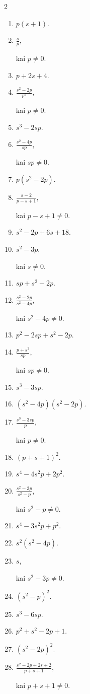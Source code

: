 \documentclass[11pt,a4paper]{article}
\begin{document}
\begin{multicols}{2}
\begin{enumerate}[start=1]
\item \(\displaystyle p(s+1)\).
\item \(\displaystyle \frac sp\),\par\nopagebreak\smallskip kai \(p\ne0\).
\item \(\displaystyle p+2s+4\).
\item \(\displaystyle \frac{s^2-2p}{p^2}\),\par\nopagebreak\smallskip kai \(p\ne0\).
\item \(\displaystyle s^3-2sp\).
\item \(\displaystyle \frac{s^2-4p}{sp}\),\par\nopagebreak\smallskip kai \(sp\ne0\).
\item \(\displaystyle p(s^2-2p)\).
\item \(\displaystyle \frac{s-2}{p-s+1}\),\par\nopagebreak\smallskip kai \(p-s+1\ne0\).
\item \(\displaystyle s^2-2p+6s+18\).
\item \(\displaystyle s^2-3p\),\par\nopagebreak\smallskip kai \(s\ne0\).
\item \(\displaystyle sp+s^2-2p\).
\item \(\displaystyle \frac{s^2-2p}{s^2-4p}\),\par\nopagebreak\smallskip kai \(s^2-4p\ne0\).
\item \(\displaystyle p^2-2sp+s^2-2p\).
\item \(\displaystyle \frac{p+s^2}{sp}\),\par\nopagebreak\smallskip kai \(sp\ne0\).
\item \(\displaystyle s^3-3sp\).
\item \(\displaystyle (s^2-4p)(s^2-2p)\).
\item \(\displaystyle \frac{s^3-3sp}{p}\),\par\nopagebreak\smallskip kai \(p\ne0\).
\item \(\displaystyle (p+s+1)^2\).
\item \(\displaystyle s^4-4s^2p+2p^2\).
\item \(\displaystyle \frac{s^2-3p}{s^2-p}\),\par\nopagebreak\smallskip kai \(s^2-p\ne0\).
\item \(\displaystyle s^4-3s^2p+p^2\).
\item \(\displaystyle s^2(s^2-4p)\).
\item \(\displaystyle s\),\par\nopagebreak\smallskip kai \(s^2-3p\ne0\).
\item \(\displaystyle (s^2-p)^2\).
\item \(\displaystyle s^3-6sp\).
\item \(\displaystyle p^2+s^2-2p+1\).
\item \(\displaystyle (s^2-2p)^2\).
\item \(\displaystyle \frac{s^2-2p+2s+2}{p+s+1}\),\par\nopagebreak\smallskip kai \(p+s+1\ne0\).
\end{enumerate}
\end{multicols}
\end{document}
